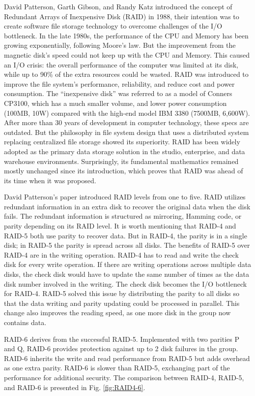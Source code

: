 \documentclass[journal]{IEEEtran}
\begin{document}
 David Patterson, Garth Gibson, and Randy Katz introduced the concept of Redundant Arrays of Inexpensive Disk (RAID) \cite{10.1145/971701.50214} in 1988, their intention was to create software file storage technology to overcome challenges of the I/O bottleneck. In the late 1980s, the performance of the CPU and Memory has been growing exponentially, following Moore’s law. But the improvement from the magnetic disk’s speed could not keep up with the CPU and Memory. This caused an I/O crisis: the overall performance of the computer was limited at its disk, while up to 90\% of the extra resources could be wasted. RAID was introduced to improve the file system’s performance, reliability, and reduce cost and power consumption. The “inexpensive disk” was referred to as a model of Conners CP3100, which has a much smaller volume, and lower power consumption (100MB, 10W) compared with the high-end model IBM 3380 (7500MB, 6,600W). After more than 30 years of development in computer technology, these specs are outdated. But the philosophy in file system design that uses a distributed system replacing centralized file storage showed its superiority. RAID has been widely adopted as the primary data storage solution in the studio, enterprise, and data warehouse environments. Surprisingly, its fundamental mathematics remained mostly unchanged since its introduction, which proves that RAID was ahead of its time when it was proposed.

David Patterson’s paper introduced RAID levels from one to five. RAID utilizes redundant information in an extra disk to recover the original data when the disk fails. The redundant information is structured as mirroring, Hamming code, or parity depending on its RAID level. It is worth mentioning that RAID-4 and RAID-5 both use parity to recover data. But in RAID-4, the parity is in a single disk; in RAID-5 the parity is spread across all disks. The benefits of RAID-5 over RAID-4 are in the writing operation. RAID-4 has to read and write the check disk for every write operation. If there are writing operations across multiple data disks, the check disk would have to update the same number of times as the data disk number involved in the writing. The check disk becomes the I/O bottleneck for RAID-4. RAID-5 solved this issue by distributing the parity to all disks so that the data writing and parity updating could be processed in parallel. This change also improves the reading speed, as one more disk in the group now contains data. 

RAID-6 derives from the successful RAID-5. Implemented with two parities P and Q, RAID-6 provides protection against up to 2 disk failures in the group. RAID-6 inherits the write and read performance from RAID-5 but adds overhead as one extra parity. RAID-6 is slower than RAID-5, exchanging part of the performance for additional security. The comparison between RAID-4, RAID-5, and RAID-6 is presented in Fig. \ref{fig:RAID4-6}.
\end{document}
